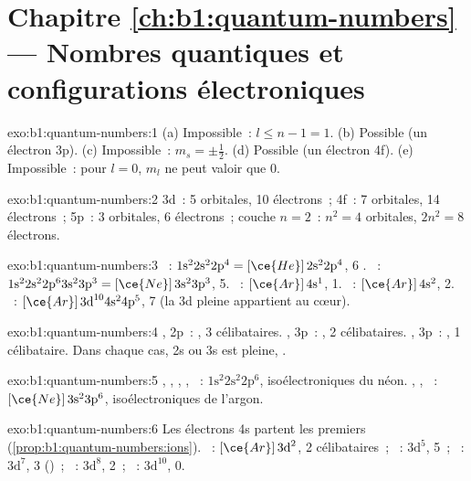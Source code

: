 \section*{Chapitre \ref{ch:b1:quantum-numbers} --- Nombres quantiques et configurations électroniques}

\begin{solution}{exo:b1:quantum-numbers:1}
(a) Impossible~: $l \le n - 1 = 1$. (b) Possible (un électron 3p).
(c) Impossible~: $m_s = \pm\tfrac12$. (d) Possible (un électron 4f).
(e) Impossible~: pour $l = 0$, $m_l$ ne peut valoir que 0.
\end{solution}

\begin{solution}{exo:b1:quantum-numbers:2}
3d~: 5 orbitales, 10 électrons~; 4f~: 7 orbitales, 14 électrons~; 5p~: 3
orbitales, 6 électrons~; couche $n = 2$~: $n^2 = 4$ orbitales, $2n^2 = 8$
électrons.
\end{solution}

\begin{solution}{exo:b1:quantum-numbers:3}
~: $1\text{s}^2 2\text{s}^2 2\text{p}^4 = [\ce{He}]\,2\text{s}^2 2\text{p}^4$,
6 . ~: $1\text{s}^2 2\text{s}^2 2\text{p}^6 3\text{s}^2
3\text{p}^3 = [\ce{Ne}]\,3\text{s}^2 3\text{p}^3$, 5. ~: $[\ce{Ar}]\,4\text{s}^1$,
1. ~: $[\ce{Ar}]\,4\text{s}^2$, 2. ~: $[\ce{Ar}]\,3\text{d}^{10}
4\text{s}^2 4\text{p}^5$, 7 (la  3d pleine appartient au cœur).
\end{solution}

\begin{solution}{exo:b1:quantum-numbers:4}
, 2p~: , 3 célibataires. , 3p~: ,
2 célibataires. , 3p~: , 1 célibataire. Dans
chaque cas, 2s ou 3s est pleine, .
\end{solution}

\begin{solution}{exo:b1:quantum-numbers:5}
, , , , ~: $1\text{s}^2
2\text{s}^2 2\text{p}^6$, isoélectroniques du néon. , ,
~: $[\ce{Ne}]\,3\text{s}^2 3\text{p}^6$, isoélectroniques de
l'argon.
\end{solution}

\begin{solution}{exo:b1:quantum-numbers:6}
Les électrons 4s partent les premiers (\cref{prop:b1:quantum-numbers:ions}).
~: $[\ce{Ar}]\,3\text{d}^2$, 2 célibataires~; ~:
$3\text{d}^5$, 5~; ~: $3\text{d}^7$, 3 ()~;
~: $3\text{d}^8$, 2~; ~: $3\text{d}^{10}$, 0.
\end{solution}

